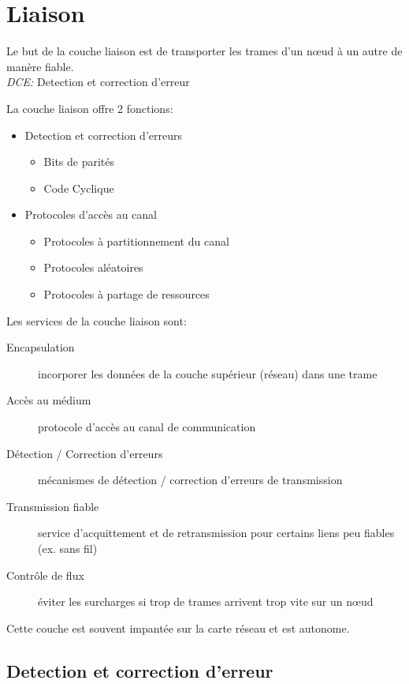 \documentclass[a4paper, 12pt, french]{article}
\begin{document}
	\section{Liaison}

	Le but de la couche liaison est de transporter les trames d'un nœud à un autre de manère fiable.\\

	\emph{DCE: } Detection et correction d'erreur

	La couche liaison offre 2 fonctions:
	\begin{itemize}
		\item Detection et correction d'erreurs
		\begin{itemize}
			\item Bits de parités
			\item Code Cyclique
		\end{itemize}
		\item Protocoles d'accès au canal
		\begin{itemize}
			\item Protocoles à partitionnement du canal
			\item Protocoles aléatoires
			\item Protocoles à partage de ressources
		\end{itemize}
	\end{itemize}

	Les services de la couche liaison sont:
	\begin{description}
		\item[Encapsulation] incorporer les données de la couche supérieur (réseau) dans une trame
		\item[Accès au médium] protocole d'accès au canal de communication
		\item[Détection / Correction d'erreurs] mécanismes de détection / correction d'erreurs de transmission
		\item[Transmission fiable] service d'acquittement et de retransmission pour certains liens peu fiables (ex. sans fil)
		\item[Contrôle de flux] éviter les surcharges si trop de trames arrivent trop vite sur un nœud
	\end{description}

	Cette couche est souvent impantée sur la carte réseau et est autonome.

	\subsection{Detection et correction d'erreur}
\end{document}
